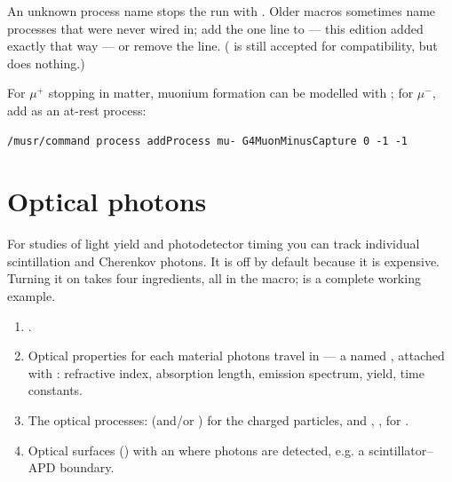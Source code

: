 \begin{pitfall}
An unknown process name stops the run with . Older macros sometimes name processes that were never wired in; add the one line to  --- this edition added  exactly that way --- or remove the line. ( is still accepted for compatibility, but does nothing.)
\end{pitfall}

For \(\mu^+\) stopping in matter, muonium formation can be modelled with ; for \(\mu^-\), add  as an at-rest process:

\begin{lstlisting}[style=mac,caption={Negative-muon capture at rest}]
/musr/command process addProcess mu- G4MuonMinusCapture 0 -1 -1
\end{lstlisting}

\section{Optical photons}
\label{sec:optical}
For studies of light yield and photodetector timing you can track individual scintillation and Cherenkov photons. It is off by default because it is expensive. Turning it on takes four ingredients, all in the macro;  is a complete working example.

\begin{enumerate}
  \item {}.
  \item Optical properties for each material photons travel in --- a named , attached with : refractive index, absorption length, emission spectrum, yield, time constants.
  \item The optical processes:  (and/or ) for the charged particles, and , ,  for .
  \item Optical surfaces () with an  where photons are detected, e.g. a scintillator--APD boundary.
\end{enumerate}

